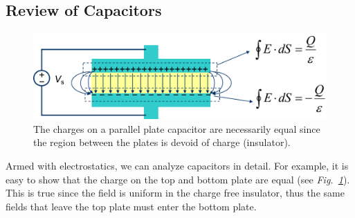 \subsection{Review of Capacitors}
\begin{figure}[tbh]
\centering
\includegraphics[width=.95\columnwidth]{mod2-2_ICtech_sld_18}
\caption{The charges on a parallel plate capacitor are necessarily equal since the region between the plates is devoid of charge (insulator).}
\label{fig:mod2-2_ICtech_sld_18}
\end{figure}
Armed with electrostatics, we can analyze capacitors in detail.  For example, it is easy to show that the charge on the top and bottom plate are equal (see \emph{Fig.~\ref{fig:mod2-2_ICtech_sld_18}}).  This is true since the field is uniform in the charge free insulator, thus the same fields that leave the top plate must enter the bottom plate.


